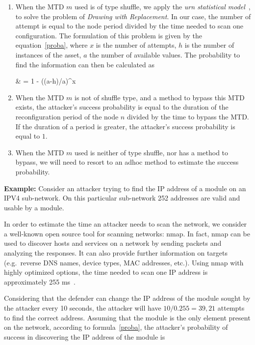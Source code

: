 \begin{enumerate}
	\item When the MTD $m$ used is of type shuffle, we apply the \textit{urn statistical model}~\cite{carroll_analysis_2014}, to solve the problem of \textit{Drawing with Replacement}. In our case, the number of attempt is equal to the node period divided by the time needed to scan one configuration. The formulation of this problem is given by the equation~\eqref{proba}, where $x$ is the number of attempts, $h$ is the number of instances of the asset, $a$ the number of available values. The probability to find the information can then be calculated as
	\begin{flalign} & = 1 - ((a-h)/a)^x \label{proba}\end{flalign}
    \item When the MTD $m$ is not of shuffle type, and a method to bypass this MTD exists, the attacker's success probability is equal to the duration of the reconfiguration period of the node $n$ divided by the time to bypass the MTD. If the duration of a period is greater, the attacker's success probability is equal to $1$.
	\item When the MTD $m$ used is neither of type shuffle, nor has a method to bypass, we will need to resort to an adhoc method to estimate the success probability.\\[1ex]
\end{enumerate} 


\noindent\textbf{Example: } 
Consider an attacker trying to find the IP address of a module on an IPV4 sub-network. On this particular sub-network 252 addresses are valid and usable by a module.

In order to estimate the time an attacker needs to scan the network, we consider a well-known open source tool for scanning networks: nmap. In fact, nmap can be used to discover hosts and services
on a network by sending packets and analyzing the responses. It can also provide further information on targets (e.g.~reverse DNS names, device types, MAC addresses, etc.). Using nmap with highly optimized options, the time needed to scan one IP address is approximately 255 ms~\cite{nmap}.

Considering that the defender can change the IP address of the module sought by the attacker every 10 seconds, the attacker will have $10/0.255 = 39,21$ attempts to find the correct address.
Assuming that the module is the only element present on the network, according to formula~\eqref{proba}, the attacker's probability of success in discovering the IP address of the module is

